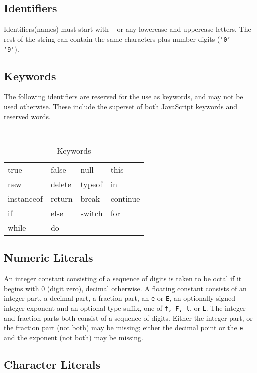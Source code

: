 \documentclass[10pt]{report}
\begin{document}
\subsection{Identifiers}
\label{sec:identifiers}

Identifiers(names) must start with \texttt{\_} or any lowercase and uppercase letters. The rest of the string can contain the same characters plus number digits (\texttt{'0' - '9'}).

\subsection{Keywords}
\label{sec:keywords}

The following identifiers are reserved for the use as keywords, and may not be used otherwise. These include the superset of both JavaScript keywords and reserved words. 

\begin{table}[ch]
  \centering
  {\tt
  \begin{tabular}{l l l l}
    true       & false   & null    & this \\
    new        & delete  & typeof  & in  \\
    instanceof & return  & break   & continue \\
    if         & else    & switch  & for \\
    while   & do \\
  \end{tabular}
  }
  \caption{Keywords}
\end{table}
\subsection{Numeric Literals}
\label{sec:numeric_lit}

An integer constant consisting of a sequence of digits is taken to be octal if it begins with 0 (digit zero), decimal otherwise. A floating constant consists of an integer part, a decimal part, a fraction part, an \texttt{e} or \texttt{E}, an optionally signed integer exponent and an optional type suffix, one of \texttt{f, F, l}, or \texttt{L}. The integer and fraction parts both consist of a sequence of digits. Either the integer part, or the fraction part (not both) may be missing; either the decimal point or the \texttt{e} and the exponent (not both) may be missing.

\subsection{Character Literals}
\label{sec:char_lit}
\end{document}
